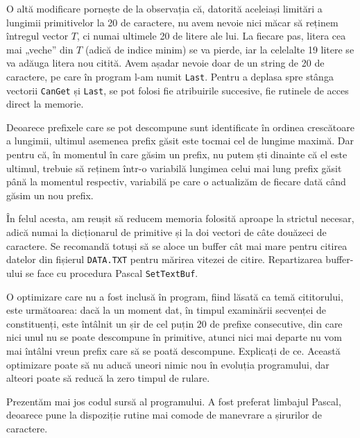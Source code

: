 O altă modificare pornește de la observația că, datorită aceleiași limitări a
lungimii primitivelor la 20 de caractere, nu avem nevoie nici măcar să reținem
întregul vector $T$, ci numai ultimele 20 de litere ale lui. La fiecare pas,
litera cea mai „veche” din $T$ (adică de indice minim) se va pierde, iar la
celelalte 19 litere se va adăuga litera nou citită. Avem așadar nevoie doar de
un string de 20 de caractere, pe care în program l-am numit {\tt Last}. Pentru
a deplasa spre stânga vectorii {\tt CanGet} și {\tt Last}, se pot folosi fie
atribuirile succesive, fie rutinele de acces direct la memorie.

Deoarece prefixele care se pot descompune sunt identificate în ordinea
crescătoare a lungimii, ultimul asemenea prefix găsit este tocmai cel de
lungime maximă. Dar pentru că, în momentul în care găsim un prefix, nu putem
ști dinainte că el este ultimul, trebuie să reținem într-o variabilă lungimea
celui mai lung prefix găsit până la momentul respectiv, variabilă pe care o
actualizăm de fiecare dată când găsim un nou prefix.

În felul acesta, am reușit să reducem memoria folosită aproape la strictul
necesar, adică numai la dicționarul de primitive și la doi vectori de câte
douăzeci de caractere. Se recomandă totuși să se aloce un buffer cât mai mare
pentru citirea datelor din fișierul {\tt DATA.TXT} pentru mărirea vitezei de
citire. Repartizarea buffer-ului se face cu procedura Pascal {\tt SetTextBuf}.

O optimizare care nu a fost inclusă în program, fiind lăsată ca temă
cititorului, este următoarea: dacă la un moment dat, în timpul examinării
secvenței de constituenți, este întâlnit un șir de cel puțin 20 de prefixe
consecutive, din care nici unul nu se poate descompune în primitive, atunci
nici mai departe nu vom mai întâlni vreun prefix care să se poată
descompune. Explicați de ce. Această optimizare poate să nu aducă uneori nimic
nou în evoluția programului, dar alteori poate să reducă la zero timpul de
rulare.

Prezentăm mai jos codul sursă al programului. A fost preferat limbajul Pascal,
deoarece pune la dispoziție rutine mai comode de manevrare a șirurilor de
caractere.

